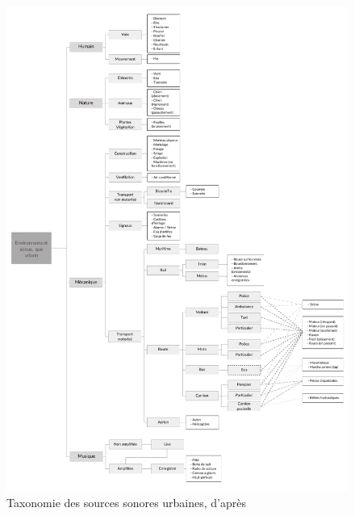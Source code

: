 \begin{figure}[t]
        \myfloatalign
        \includegraphics[width=\linewidth]{gfx/categoSalamon}
        \caption{Taxonomie des sources sonores urbaines, d'après \citep{Salamon14}}\label{fig:catSoundscapeSalamon}
\end{figure}



